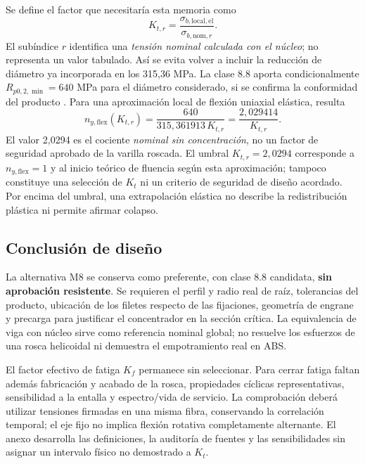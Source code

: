 Se define el factor que necesitaría esta memoria como
\begin{equation}
 K_{t,r}=\frac{\sigma_{b,\mathrm{local},\mathrm{el}}}
 {\sigma_{b,\mathrm{nom},r}}.
 \label{eq:Kt_raiz_M8}
\end{equation}
El subíndice $r$ identifica una \emph{tensión nominal calculada con el
núcleo}; no representa un valor tabulado. Así se evita volver a incluir
la reducción de diámetro ya incorporada en los 315,36 MPa.
La clase 8.8 aporta condicionalmente $R_{p0,2,\min}=640$ MPa para el
diámetro considerado, si se confirma la conformidad del producto
\cite{boellhoff_manual_8100_2023}. Para una aproximación local de flexión
uniaxial elástica, resulta
\begin{equation}
 n_{y,\mathrm{flex}}(K_{t,r})
 =\frac{640}{315,361913\,K_{t,r}}
 =\frac{2,029414}{K_{t,r}}.
 \label{eq:ny_M8_condicionado}
\end{equation}
El valor 2,0294 es el cociente \emph{nominal sin concentración}, no un
factor de seguridad aprobado de la varilla roscada. El umbral
$K_{t,r}=2,0294$ corresponde a $n_{y,\mathrm{flex}}=1$ y al inicio
teórico de fluencia según esta aproximación; tampoco constituye una
selección de $K_t$ ni un criterio de seguridad de diseño acordado.
Por encima del umbral, una extrapolación elástica no describe la
redistribución plástica ni permite afirmar colapso.

\subsection{Conclusión de diseño}
La alternativa M8 se conserva como preferente, con clase 8.8 candidata,
\textbf{sin aprobación resistente}. Se requieren el perfil y radio real
de raíz, tolerancias del producto, ubicación de los filetes respecto de
las fijaciones, geometría de engrane y precarga para justificar el
concentrador en la sección crítica. La equivalencia de viga con núcleo
sirve como referencia nominal global; no resuelve los esfuerzos de una
rosca helicoidal ni demuestra el empotramiento real en ABS.

El factor efectivo de fatiga $K_f$ permanece sin seleccionar. Para cerrar
fatiga faltan además fabricación y acabado de la rosca, propiedades
cíclicas representativas, sensibilidad a la entalla y espectro/vida de
servicio. La comprobación deberá utilizar tensiones firmadas en una misma
fibra, conservando la correlación temporal; el eje fijo no implica
flexión rotativa completamente alternante. El anexo desarrolla las
definiciones, la auditoría de fuentes y las sensibilidades sin asignar
un intervalo físico no demostrado a $K_t$.
